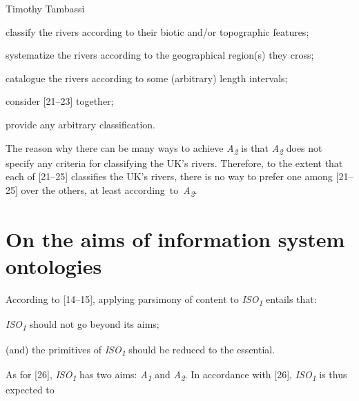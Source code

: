 \begin{artengenv}{Timothy Tambassi}
\begin{enumerate}[label={[\arabic*]}]
\setcounter{enumi}{\value{saveenumtambassi}}

\item classify the rivers according to their biotic and/or topographic features;

\item systematize the rivers according to the geographical region(s) they cross;

\item catalogue the rivers according to some (arbitrary) length intervals;

\item consider [21–23] together;

\item provide any arbitrary classification.

\end{enumerate}

The reason why there can be many ways to achieve \textit{A}\textit{\textsubscript{2}} is that \textit{A}\textit{\textsubscript{2}} does not specify any criteria for classifying the UK's rivers. Therefore, to the extent that each of [21–25] classifies the UK's rivers, there is no way to prefer one among [21–25] over the others, at least \mbox{according to \textit{A}\textit{\textsubscript{2}}.}



\section{On the aims of information system ontologies}

According to [14–15], applying parsimony of content to \textit{ISO}\textit{\textsubscript{1}} entails that:



\setcounter{saveenumtambassi}{\value{enumi}}

\begin{enumerate}[label={[\arabic*]}]

\setcounter{enumi}{\value{saveenumtambassi}}

\item \textit{ISO}\textit{\textsubscript{1}} should not go beyond its aims;

\item (and) the primitives of \textit{ISO}\textit{\textsubscript{1}} should be reduced to the essential.

\end{enumerate}

As for [26], \textit{ISO}\textit{\textsubscript{1}} has two aims: \textit{A}\textit{\textsubscript{1}} and \textit{A}\textit{\textsubscript{2}}. In accordance with [26], \textit{ISO}\textit{\textsubscript{1}} is thus expected to




\end{artengenv}
